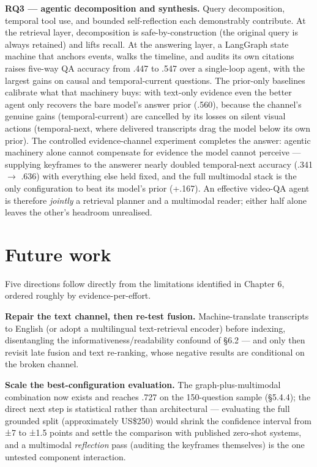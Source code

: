 \textbf{RQ3 --- agentic decomposition and synthesis.} Query
decomposition, temporal tool use, and bounded self-reflection each
demonstrably contribute. At the retrieval layer, decomposition is
safe-by-construction (the original query is always retained) and lifts
recall. At the answering layer, a LangGraph state machine that anchors
events, walks the timeline, and audits its own citations raises five-way
QA accuracy from .447 to .547 over a single-loop agent, with the largest
gains on causal and temporal-current questions. The prior-only baselines
calibrate what that machinery buys: with text-only evidence even the
better agent only recovers the bare model's answer prior (.560), because
the channel's genuine gains (temporal-current) are cancelled by its
losses on silent visual actions (temporal-next, where delivered
transcripts drag the model below its own prior). The controlled
evidence-channel experiment completes the answer: agentic machinery
alone cannot compensate for evidence the model cannot perceive ---
supplying keyframes to the answerer nearly doubled temporal-next
accuracy (.341 \ensuremath{\rightarrow} .636) with everything else held
fixed, and the full multimodal stack is the only configuration to beat
its model's prior (+.167). An effective video-QA agent is therefore
\emph{jointly} a retrieval planner and a multimodal reader; either half
alone leaves the other's headroom unrealised.

\section{Future work}

Five directions follow directly from the limitations identified in
Chapter 6, ordered roughly by evidence-per-effort.

\textbf{Repair the text channel, then re-test fusion.} Machine-translate
transcripts to English (or adopt a multilingual text-retrieval encoder)
before indexing, disentangling the informativeness/readability confound
of §6.2 --- and only then revisit late fusion and text re-ranking, whose
negative results are conditional on the broken channel.

\textbf{Scale the best-configuration evaluation.} The
graph-plus-multimodal combination now exists and reaches .727 on the
150-question sample (§5.4.4); the direct next step is statistical rather
than architectural --- evaluating the full grounded split (approximately
US\$250) would shrink the confidence interval from ±7 to ±1.5 points and
settle the comparison with published zero-shot systems, and a multimodal
\emph{reflection} pass (auditing the keyframes themselves) is the one
untested component interaction.

